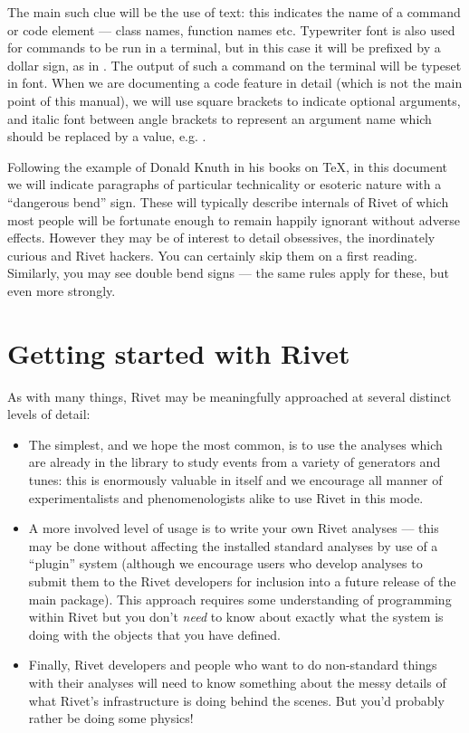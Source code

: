 \documentclass{JHEP3}
\begin{document}
The main such clue will be the use of  text: this
indicates the name of a command or code element --- class names, function names
etc. Typewriter font is also used for commands to be run in a terminal, but in
this case it will be prefixed by a dollar sign, as in .  The output of such a command on the terminal will be typeset in
 font. When we are documenting a code feature in detail (which
is not the main point of this manual), we will use square brackets to indicate
optional arguments, and italic font between angle brackets to represent an
argument name which should be replaced by a value,
e.g. .

Following the example of Donald Knuth in his books on \TeX{}, in this document
we will indicate paragraphs of particular technicality or esoteric nature with a
``dangerous bend'' sign. These will
typically describe internals of Rivet of which most people will be fortunate
enough to remain happily ignorant without adverse effects. However they may be
of interest to detail obsessives, the inordinately curious and Rivet
hackers. You can certainly skip them on a first reading. Similarly, you may see
double bend signs  --- the same rules apply
for these, but even more strongly.


\cleardoublepage
\part{Getting started with Rivet}
\label{part:gettingstarted}

As with many things, Rivet may be meaningfully approached at several distinct
levels of detail:

\begin{itemize}
\item The simplest, and we hope the most common, is to use the analyses which
  are already in the library to study events from a variety of generators and
  tunes: this is enormously valuable in itself and we encourage all manner of
  experimentalists and phenomenologists alike to use Rivet in this mode.
\item A more involved level of usage is to write your own Rivet analyses ---
  this may be done without affecting the installed standard analyses by use of a
  ``plugin'' system (although we encourage users who develop analyses to submit
  them to the Rivet developers for inclusion into a future release of the main
  package). This approach requires some understanding of programming within
  Rivet but you don't \emph{need} to know about exactly what the system is doing
  with the objects that you have defined.
\item Finally, Rivet developers and people who want to do non-standard things
  with their analyses will need to know something about the messy details of
  what Rivet's infrastructure is doing behind the scenes. But you'd probably
  rather be doing some physics!
\end{itemize}
\end{document}
